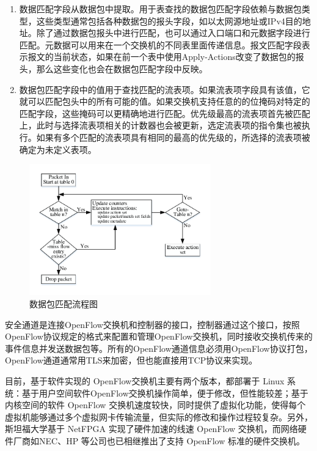 \begin{enumerate}
\item 数据匹配字段从数据包中提取。用于表查找的数据包匹配字段依赖与数据包类型，这些类型通常包括各种数据包的报头字段，如以太网源地址或IPv4目的地址。除了通过数据包报头中进行匹配，也可以通过入口端口和元数据字段进行匹配。元数据可以用来在一个交换机的不同表里面传递信息。报文匹配字段表示报文的当前状态，如果在前一个表中使用Apply-Actions改变了数据包的报头，那么这些变化也会在数据包匹配字段中反映。 
\item 数据包匹配字段中的值用于查找匹配的流表项。如果流表项字段具有该值，它就可以匹配包头中的所有可能的值。如果交换机支持任意的的位掩码对特定的匹配字段，这些掩码可以更精确地进行匹配。优先级最高的流表项首先被匹配上，此时与选择流表项相关的计数器也会被更新，选定流表项的指令集也被执行。如果有多个匹配的流表项具有相同的最高的优先级的，所选择的流表项被确定为未定义表项\cite{openflow-7}。
\end{enumerate}

\begin{figure}[!htb]
  \centering
  \includegraphics[width=0.7\textwidth]{logo/match}
  \caption{数据包匹配流程图}
  \label{fig:match}
\end{figure}

安全通道是连接OpenFlow交换机和控制器的接口，控制器通过这个接口，按照 OpenFlow协议规定的格式来配置和管理OpenFlow交换机，同时接收交换机传来的事件信息并发送数据包等。所有的OpenFlow通道信息必须用OpenFlow协议打包，OpenFlow通道通常用TLS来加密，但也能直接用TCP协议来实现。

目前，基于软件实现的 OpenFlow交换机主要有两个版本\cite{openflow-2}，都部署于 Linux 系统：基于用户空间软件OpenFlow交换机操作简单，便于修改，但性能较差；基于内核空间的软件 OpenFlow 交换机\cite{openflow-3}速度较快，同时提供了虚拟化功能，使得每个虚拟机能够通过多个虚拟网卡传输流量，但实际的修改和操作过程较复杂。另外，斯坦福大学基于 NetFPGA 实现了硬件加速的线速 OpenFlow 交换机\cite{openflow-4}，而网络硬件厂商如NEC、HP 等公司也已相继推出了支持 OpenFlow 标准的硬件交换机\cite{openflow-1}。
